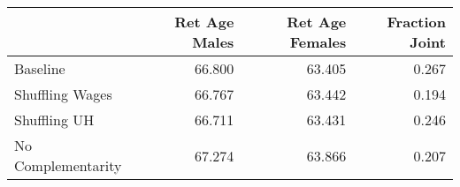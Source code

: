 \begin{tabular}{lrrr}
\toprule
{} & Ret Age Males & Ret Age Females & Fraction Joint \\
\midrule
Baseline           &        66.800 &          63.405 &          0.267 \\
Shuffling Wages    &        66.767 &          63.442 &          0.194 \\
Shuffling UH       &        66.711 &          63.431 &          0.246 \\
No Complementarity &        67.274 &          63.866 &          0.207 \\
\bottomrule
\end{tabular}
